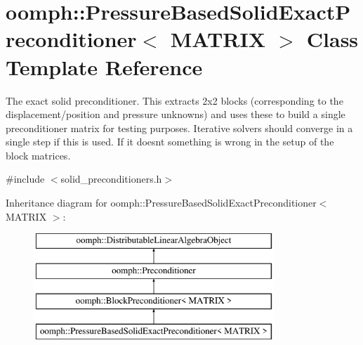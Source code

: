 \hypertarget{classoomph_1_1PressureBasedSolidExactPreconditioner}{}\section{oomph\+:\+:Pressure\+Based\+Solid\+Exact\+Preconditioner$<$ M\+A\+T\+R\+IX $>$ Class Template Reference}
\label{classoomph_1_1PressureBasedSolidExactPreconditioner}


The exact solid preconditioner. This extracts 2x2 blocks (corresponding to the displacement/position and pressure unknowns) and uses these to build a single preconditioner matrix for testing purposes. Iterative solvers should converge in a single step if this is used. If it doesn\textquotesingle{}t something is wrong in the setup of the block matrices.  




{\ttfamily \#include $<$solid\+\_\+preconditioners.\+h$>$}

Inheritance diagram for oomph\+:\+:Pressure\+Based\+Solid\+Exact\+Preconditioner$<$ M\+A\+T\+R\+IX $>$\+:\begin{figure}[H]
\begin{center}
\leavevmode
\includegraphics[height=4.000000cm]{classoomph_1_1PressureBasedSolidExactPreconditioner}
\end{center}
\end{figure}
